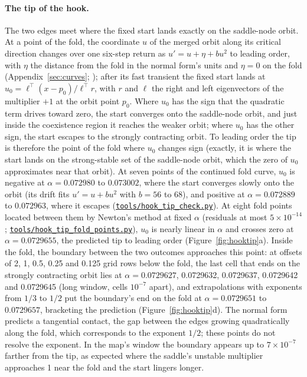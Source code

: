 \documentclass[11pt,letterpaper]{article}
\newcommand{\repourl}{https://github.com/tdj28/neural-shrimp}
\newcommand{\reporef}{arxiv-v1}
\newcommand{\repo}[1]{\href{\repourl/blob/\reporef/#1}{\nolinkurl{#1}}}
\begin{document}
\paragraph{The tip of the hook.} The two edges meet where the fixed start lands exactly on the saddle-node orbit. At
a point of the fold, the coordinate $u$ of the merged orbit along its critical direction changes over one six-step return as
$u'=u+\eta+bu^2$ to leading order, with $\eta$ the distance from the fold in the normal form's units and $\eta=0$ on
the fold (Appendix~\ref{sec:curves}; \cite{kuznetsov2023elements}); after its fast transient the fixed start lands at
$u_0=\ell^\top(x-p_0)/\ell^\top r$, with $r$ and $\ell$ the right and left eigenvectors of the multiplier $+1$ at the
orbit point $p_0$. Where $u_0$ has the sign that the quadratic term drives toward zero, the start converges onto the
saddle-node orbit, and just inside the coexistence region it reaches the weaker orbit; where $u_0$ has the other sign,
the start escapes to the strongly contracting orbit. To leading order the tip is therefore the point of the fold where $u_0$
changes sign (exactly, it is where the start lands on the strong-stable set of the saddle-node orbit, which the zero of
$u_0$ approximates near that orbit). At seven points of the continued fold curve, $u_0$ is negative at $\alpha=0.072980$ to $0.073002$, where the
start converges slowly onto the orbit (its drift fits $u'=u+bu^2$ with $b=56$ to 68), and positive at $\alpha=0.072889$
to $0.072963$, where it escapes (\repo{tools/hook_tip_check.py}). At eight fold points located between them by
Newton's method at fixed $\alpha$ (residuals at most $5\times10^{-14}$; \repo{tools/hook_tip_fold_points.py}), $u_0$ is
nearly linear in $\alpha$ and crosses zero at $\alpha=0.0729655$, the predicted tip to leading order
(Figure~\ref{fig:hooktip}a). Inside the fold, the
boundary between the two outcomes approaches this point: at offsets of 2, 1, 0.5, 0.25 and 0.125 grid rows below the
fold, the last cell that ends on the strongly contracting orbit lies at $\alpha=0.0729627$, 0.0729632, 0.0729637,
0.0729642 and 0.0729645 (long window, cells $10^{-7}$ apart), and extrapolations with exponents from $1/3$ to $1/2$
put the boundary's end on the fold at $\alpha=0.0729651$ to $0.0729657$, bracketing the prediction
(Figure~\ref{fig:hooktip}d). The normal form predicts a tangential contact, the gap between the edges growing
quadratically along the fold, which corresponds to the exponent $1/2$; these points do not resolve the exponent. In
the map's window the boundary appears up to $7\times10^{-7}$ farther from the tip, as expected where the saddle's
unstable multiplier approaches 1 near the fold and the start lingers longer.
\end{document}
